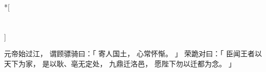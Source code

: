 
\switchcolumn[0]*[\section{}]

元帝始过江，
谓顾骠骑曰：「
    寄人国土，
    心常怀惭。
」
荣跪对曰：「
    臣闻王者以天下为家，
    是以耿、亳无定处，
    九鼎迁洛邑，
    愿陛下勿以迁都为念。
」

\switchcolumn


